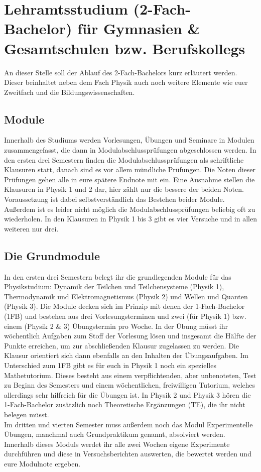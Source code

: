 \section[Lehramtsstudium (2-Fach-Bachelor) für Gymnasien \& Gesamtschulen bzw. Berufskollegs]{Lehramtsstudium (2-Fach-Bachelor) für Gymnasien \& Gesamtschulen bzw. Berufskollegs}

\begin{multicols*}{2}
An dieser Stelle soll der Ablauf des 2-Fach-Bachelors kurz erläutert werden. Dieser beinhaltet neben dem Fach Physik auch noch weitere Elemente wie euer Zweitfach und die Bildungswissenschaften.
\subsection*{Module}
Innerhalb des Studiums werden Vorlesungen, Übungen und Seminare in Modulen zusammengefasst, die dann in Modulabschlussprüfungen abgeschlossen werden. In den ersten drei Semestern finden die Modulabschlussprüfungen als schriftliche Klausuren statt, danach sind es vor allem mündliche Prüfungen. Die Noten dieser Prüfungen gehen alle in eure spätere Endnote mit ein. Eine Ausnahme stellen die Klausuren in Physik 1 und 2 dar, hier zählt nur die bessere der beiden Noten. Voraussetzung ist dabei selbstverständlich das Bestehen beider Module. Außerdem ist es leider nicht möglich die Modulabschlussprüfungen beliebig oft zu wiederholen. In den Klausuren in Physik 1 bis 3 gibt es vier Versuche und in allen weiteren nur drei.
\subsection*{Die Grundmodule}
In den ersten drei Semestern belegt ihr die grundlegenden Module für das Physikstudium: Dynamik der Teilchen und Teilchensysteme (Physik 1), Thermodynamik und Elektromagnetismus (Physik 2) und Wellen und Quanten (Physik 3). Die Module decken sich im Prinzip mit denen der 1-Fach-Bachelor (1FB) und bestehen aus drei Vorlesungsterminen und zwei (für Physik 1) bzw. einem (Physik 2 \& 3) Übungstermin pro Woche. In der Übung müsst ihr wöchentlich Aufgaben zum Stoff der Vorlesung lösen und insgesamt die Hälfte der Punkte erreichen, um zur abschließenden Klausur zugelassen zu werden. Die Klausur orientiert sich dann ebenfalls an den Inhalten der Übungsaufgaben. Im Unterschied zum 1FB gibt es für euch in Physik 1 noch ein spezielles Mathetutorium. Dieses besteht aus einem verpflichtenden, aber unbenoteten, Test zu Beginn des Semesters und einem wöchentlichen, freiwilligen Tutorium, welches allerdings sehr hilfreich für die Übungen ist. In Physik 2 und Physik 3 hören die 1-Fach-Bachelor zusätzlich noch Theoretische Ergänzungen (TE), die ihr nicht belegen müsst.\\
Im dritten und vierten Semester muss außerdem noch das Modul Experimentelle Übungen, manchmal auch Grundpraktikum genannt, absolviert werden. Innerhalb dieses Moduls werdet ihr alle zwei Wochen eigene Experimente durchführen und diese in Versuchsberichten auswerten, die bewertet werden und eure Modulnote ergeben.

\end{multicols*}
